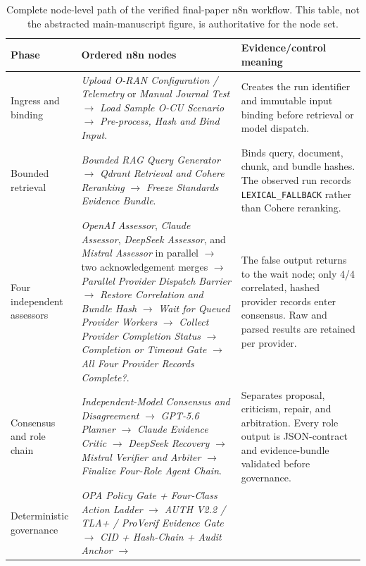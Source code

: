 \documentclass[journal]{IEEEtran}
\begin{document}
\begin{table}[!t]
\centering
\caption{Complete node-level path of the verified final-paper n8n workflow.
This table, not the abstracted main-manuscript figure, is authoritative for
the node set.}
\label{tab:node-path}
\begin{adjustbox}{width=\textwidth}
\begin{tabular}{L{2.3cm}L{9.4cm}L{6.4cm}}
\toprule
Phase & Ordered n8n nodes & Evidence/control meaning \\
\midrule
Ingress and binding &
\emph{Upload O-RAN Configuration / Telemetry} or
\emph{Manual Journal Test} $\rightarrow$
\emph{Load Sample O-CU Scenario} $\rightarrow$
\emph{Pre-process, Hash and Bind Input}. &
Creates the run identifier and immutable input binding before retrieval or
model dispatch. \\
Bounded retrieval &
\emph{Bounded RAG Query Generator} $\rightarrow$
\emph{Qdrant Retrieval and Cohere Reranking} $\rightarrow$
\emph{Freeze Standards Evidence Bundle}. &
Binds query, document, chunk, and bundle hashes. The observed run records
\texttt{LEXICAL\_FALLBACK} rather than Cohere reranking. \\
Four independent assessors &
\emph{OpenAI Assessor}, \emph{Claude Assessor},
\emph{DeepSeek Assessor}, and \emph{Mistral Assessor} in parallel
$\rightarrow$ two acknowledgement merges $\rightarrow$
\emph{Parallel Provider Dispatch Barrier} $\rightarrow$
\emph{Restore Correlation and Bundle Hash} $\rightarrow$
\emph{Wait for Queued Provider Workers} $\rightarrow$
\emph{Collect Provider Completion Status} $\rightarrow$
\emph{Completion or Timeout Gate} $\rightarrow$
\emph{All Four Provider Records Complete?}. &
The false output returns to the wait node; only 4/4 correlated, hashed provider
records enter consensus. Raw and parsed results are retained per provider. \\
Consensus and role chain &
\emph{Independent-Model Consensus and Disagreement} $\rightarrow$
\emph{GPT-5.6 Planner} $\rightarrow$
\emph{Claude Evidence Critic} $\rightarrow$
\emph{DeepSeek Recovery} $\rightarrow$
\emph{Mistral Verifier and Arbiter} $\rightarrow$
\emph{Finalize Four-Role Agent Chain}. &
Separates proposal, criticism, repair, and arbitration. Every role output is
JSON-contract and evidence-bundle validated before governance. \\
Deterministic governance &
\emph{OPA Policy Gate + Four-Class Action Ladder} $\rightarrow$
\emph{AUTH V2.2 / TLA+ / ProVerif Evidence Gate} $\rightarrow$
\emph{CID + Hash-Chain + Audit Anchor} $\rightarrow$

\end{tabular}
\end{adjustbox}
\end{table}
\end{document}
